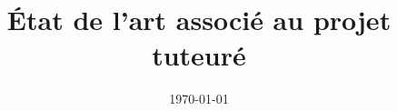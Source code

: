 \title{État de l’art associé au projet tuteuré \\ \vspace{0.5cm} \LARGE{\textbf{\projecttitle}}}
\author{}
\date{\today}